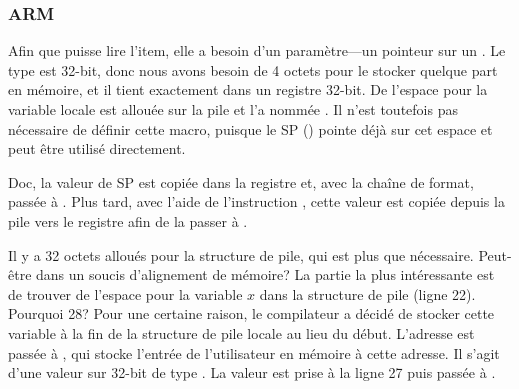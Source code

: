 \subsubsection{ARM}

\myparagraph{\OptimizingKeilVI (\ThumbMode)}



\myindex{\CLanguageElements!\Pointers}

Afin que \scanf puisse lire l'item, elle a besoin d'un paramètre---un pointeur sur un \Tint.
Le type \Tint est 32-bit, donc nous avons besoin de 4 octets pour le stocker quelque
part en mémoire, et il tient exactement dans un registre 32-bit.
De l'espace pour la variable locale  est allouée sur la pile et \IDA l'a
nommée . Il n'est toutefois pas nécessaire de définir cette macro, puisque
le \ac{SP} () pointe déjà sur cet espace et
peut être utilisé directement.

Doc, la valeur de \ac{SP} est copiée dans la registre  et, avec la chaîne
de format, passée à \scanf.
Plus tard, avec l'aide de l'instruction , cette valeur est copiée depuis
la pile vers le registre  afin de la passer à \printf.




Il y a 32 octets alloués pour la structure de pile, qui est plus que nécessaire.
Peut-être dans un soucis d'alignement de mémoire?
La partie la plus intéressante est de trouver de l'espace pour la variable $x$ dans
la structure de pile (ligne 22).
Pourquoi 28? Pour une certaine raison, le compilateur a décidé de stocker cette
variable à la fin de la structure de pile locale au lieu du début.
L'adresse est passée à \scanf, qui stocke l'entrée de l'utilisateur en mémoire à
cette adresse.
Il s'agit d'une valeur sur 32-bit de type \Tint.
La valeur est prise à la ligne 27 puis passée à \printf.

